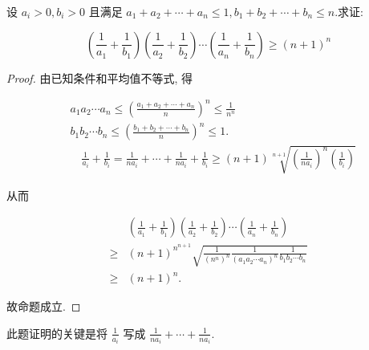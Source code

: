 \begin{example}
	设 $a_{i}>0, b_{i}>0$ 且满足 $a_{1}+a_{2}+\cdots+a_{n} \leqslant 1, b_{1}+b_{2}+\cdots+b_{n} \leqslant n$.求证:
	
	$$
	\left(\frac{1}{a_{1}}+\frac{1}{b_{1}}\right)\left(\frac{1}{a_{2}}+\frac{1}{b_{2}}\right) \cdots\left(\frac{1}{a_{n}}+\frac{1}{b_{n}}\right) \geqslant(n+1)^{n}
	$$
\end{example}
\begin{proof}
	由已知条件和平均值不等式, 得
	
	$$
	\begin{aligned}
	& a_{1} a_{2} \cdots a_{n} \leqslant\left(\frac{a_{1}+a_{2}+\cdots+a_{n}}{n}\right)^{n} \leqslant \frac{1}{n^{n}} \\
	& b_{1} b_{2} \cdots b_{n} \leqslant\left(\frac{b_{1}+b_{2}+\cdots+b_{n}}{n}\right)^{n} \leqslant 1 . \\
	& \quad \frac{1}{a_{i}}+\frac{1}{b_{i}}=\frac{1}{n a_{i}}+\cdots+\frac{1}{n a_{i}}+\frac{1}{b_{i}} \geqslant(n+1) \sqrt[n+1]{\left(\frac{1}{n a_{i}}\right)^{n}\left(\frac{1}{b_{i}}\right)}
	\end{aligned}
	$$
	
	从而
	
	$$
	\begin{aligned}
	& \left(\frac{1}{a_{1}}+\frac{1}{b_{1}}\right)\left(\frac{1}{a_{2}}+\frac{1}{b_{2}}\right) \cdots\left(\frac{1}{a_{n}}+\frac{1}{b_{n}}\right) \\
	\geqslant & (n+1)^{n^{n+1}} \sqrt{\frac{1}{\left(n^{n}\right)^{n}} \frac{1}{\left(a_{1} a_{2} \cdots a_{n}\right)^{n}} \frac{1}{b_{1} b_{2} \cdots b_{n}}} \\
	\geqslant & (n+1)^{n} .
	\end{aligned}
	$$
	
	故命题成立.
\end{proof}
\begin{note}
	此题证明的关键是将 $\frac{1}{a_{i}}$ 写成 $\frac{1}{n a_{i}}+\cdots+\frac{1}{n a_{i}}$.
\end{note}

